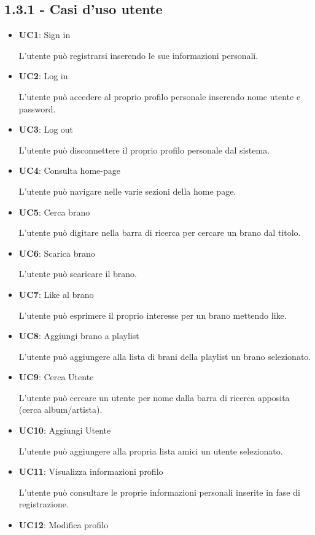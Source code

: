 \subsection*{1.3.1 - Casi d'uso utente}
\begin{itemize}
    \item \textbf{UC1}: Sign in \par
        L’utente può registrarsi inserendo le sue informazioni personali.
    \item \textbf{UC2}: Log in \par 
        L’utente può accedere al proprio profilo personale inserendo nome utente e password.
    \item \textbf{UC3}: Log out \par 
        L’utente può disconnettere il proprio profilo personale dal sistema.
    \item \textbf{UC4}: Consulta home-page \par 
        L’utente può navigare nelle varie sezioni della home page.
    \item \textbf{UC5}: Cerca brano \par 
        L’utente può digitare nella barra di ricerca per cercare un brano dal titolo.
    \item \textbf{UC6}: Scarica brano \par
        L’utente può scaricare il brano.
    \item \textbf{UC7}: Like al brano \par 
         L’utente può esprimere il proprio interesse per un brano mettendo like.
    \item \textbf{UC8}: Aggiungi brano a playlist \par 
        L’utente può aggiungere alla lista di brani della playlist un brano selezionato.
    \item \textbf{UC9}: Cerca Utente \par 
        L’utente può cercare un utente per nome dalla barra di ricerca apposita (cerca album/artista).
    \item \textbf{UC10}: Aggiungi Utente \par 
        L’utente può aggiungere alla propria lista amici un utente selezionato.
    \item \textbf{UC11}: Visualizza informazioni profilo \par 
        L’utente può consultare le proprie informazioni personali inserite in fase di registrazione. 
    \item \textbf{UC12}: Modifica profilo \par 

\end{itemize}
